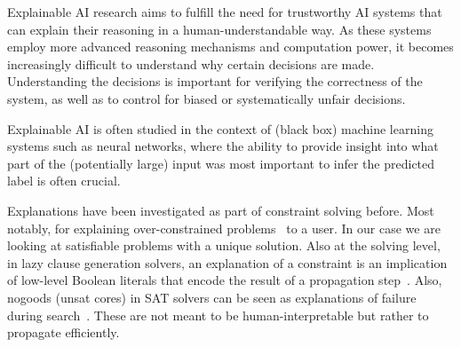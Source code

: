 

Explainable AI research aims to fulfill the need for trustworthy AI systems that can explain their reasoning in a human-understandable way. 
As these systems employ more advanced reasoning mechanisms and computation power, it becomes increasingly difficult to understand why certain decisions are made. 
Understanding the decisions is important for verifying the correctness of the system, as well as to control for biased or systematically unfair decisions.

Explainable AI is often studied in the context of (black box) machine learning systems such as neural networks, where the ability to provide insight into what part of the (potentially large) input was most important to infer the predicted label is often crucial. 

Explanations have been investigated as part of constraint solving before. Most notably, for explaining over-constrained problems~\cite{junker2001quickxplain} to a user. In our case we are looking at satisfiable problems with a unique solution. Also at the solving level, in lazy clause generation solvers, an explanation of a constraint is an implication of low-level Boolean literals that encode the result of a propagation step~\cite{feydy2009lazy}. Also, nogoods (unsat cores) in SAT solvers can be seen as explanations of failure during search~\cite{marques2009conflict}. These are not meant to be human-interpretable but rather to propagate efficiently.


